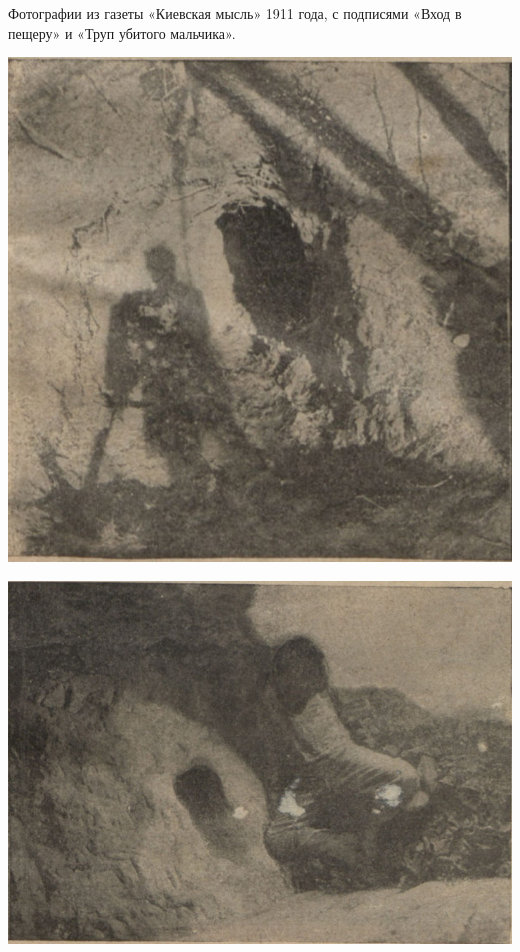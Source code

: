Фотографии из газеты «Киевская мысль» 1911 года, с подписями «Вход в пещеру» и «Труп убитого мальчика».

\begin{center}
\includegraphics[width=0.85\linewidth]{chast-kirvys/beylis/1911-by-01.jpg}
\end{center}

\begin{center}
\includegraphics[width=0.85\linewidth]{chast-kirvys/beylis/1911-by-02.jpg}
\end{center}

\newpage

